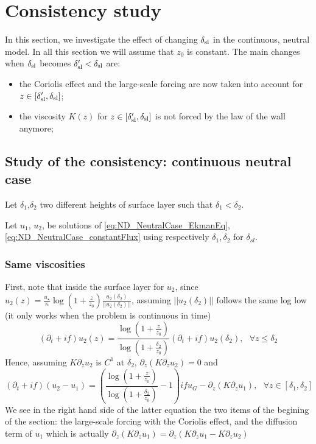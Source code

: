 \section{Consistency study}
In this section, we investigate the effect of changing
$\delta_{\rm sl}$ in the continuous, neutral model.
In all this section we will assume that
$z_0$ is constant.
The main changes when $\delta_{\rm sl}$ becomes
$\delta_{\rm sl}' < \delta_{\rm sl}$ are:
\begin{itemize}
\item the Coriolis effect and the large-scale forcing are
now taken into account for $z \in 
[\delta_{\rm sl}', \delta_{\rm sl}]$;
\item the viscosity $K(z)$ for $z \in 
[\delta_{\rm sl}', \delta_{\rm sl}]$ is not forced by the law
of the wall anymore;
\end{itemize}
\subsection{Study of the consistency: continuous neutral case}
Let $\delta_1$,$\delta_2$ two
different heights of surface layer
such that $\delta_1 < \delta_2$.

Let $u_1$, $u_2$, be solutions of 
\eqref{eq:ND_NeutralCase_EkmanEq},
\eqref{eq:ND_NeutralCase_constantFlux} using
respectively $\delta_1, \delta_2$ for $\delta_{sl}$.

\subsubsection{Same viscosities}
First, note that inside the surface layer for $u_2$,
since $u_2(z) = \frac{u_\star}{\kappa}\log(1+\frac{z}{z_0})
\frac{u_2(\delta_{2})}{||u_2(\delta_{2})||}$, assuming
$||u_2(\delta_{2})||$ follows the same log low (it only works
when the problem is continuous in time)
\begin{equation}
(\partial_t + if) u_2(z) = \frac{\log(1+\frac{z}{z_0})}
{\log(1+\frac{\delta_2}{z_0})}(\partial_t + if) u_2(\delta_2), 
~~~\forall z \leq \delta_2
\end{equation}
Hence, assuming $K\partial_z u_2$ is $C^1$ at $\delta_2$,
$\partial_z (K\partial_z u_2) = 0$ and
\begin{equation}
(\partial_t + if) (u_2 - u_1) = \left(\frac{\log(1+\frac{z}{z_0})}
{\log(1+\frac{\delta_2}{z_0})} - 1\right)i f u_G 
-
\partial_z (K \partial_z u_1), ~~~\forall z \in [\delta_1, \delta_2]
\end{equation}
We see in the right hand side of the latter equation the two items
of the begining of the section:
the large-scale forcing with the Coriolis effect,
and the diffusion term of $u_1$ which is actually
$\partial_z (K \partial_z u_1) = \partial_z (K \partial_z u_1 - K \partial_z u_2)$

